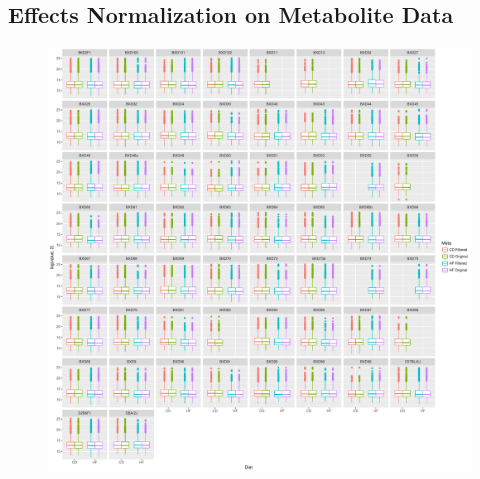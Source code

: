 \documentclass[a4paper]{book}
\begin{document}
\begin{subappendices}
\section{Effects Normalization on Metabolite Data}
\begin{figure}[ht!b]
	\centering
	\includegraphics[width=\linewidth]{Appendix_FIgures/Strain_Wise_Diet_Filt.pdf}
\end{figure}
\clearpage


\end{subappendices}
\end{document}

